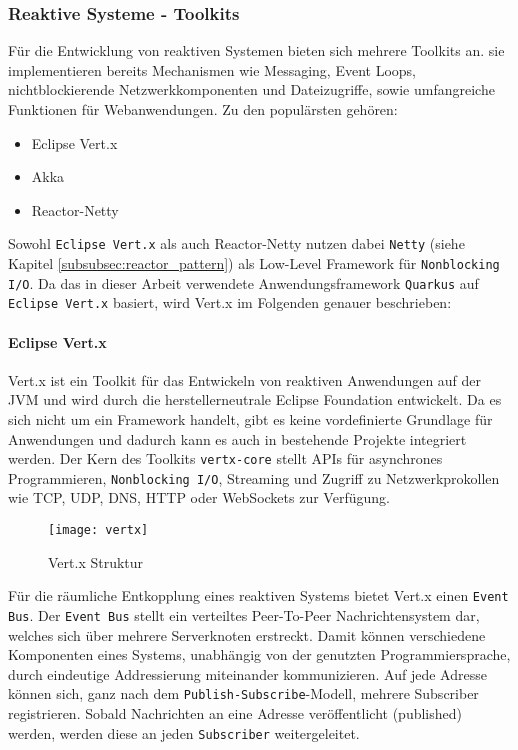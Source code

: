 \subsubsection{Reaktive Systeme - Toolkits}
\label{subsubsec:reaktive_systeme}
Für die Entwicklung von reaktiven Systemen bieten sich mehrere Toolkits an.
sie implementieren bereits Mechanismen wie Messaging, Event Loops,
nichtblockierende Netzwerkkomponenten und Dateizugriffe, sowie umfangreiche Funktionen für Webanwendungen.
Zu den populärsten gehören:
\begin{itemize}
  \item Eclipse Vert.x \parencite{Vert.x}
  \item Akka \parencite{Akka}
  \item Reactor-Netty \parencite{ProjectReactor}
\end{itemize}
Sowohl \verb|Eclipse Vert.x| als auch Reactor-Netty nutzen dabei \verb|Netty|
(siehe Kapitel \ref{subsubsec:reactor_pattern}) als Low-Level Framework für \verb|Nonblocking I/O|.
Da das in dieser Arbeit verwendete Anwendungsframework \verb|Quarkus| auf \verb|Eclipse Vert.x| basiert, wird Vert.x im Folgenden genauer beschrieben:

\paragraph{Eclipse Vert.x}
Vert.x ist ein Toolkit für das Entwickeln von reaktiven Anwendungen auf der JVM und wird durch die herstellerneutrale Eclipse Foundation entwickelt.
Da es sich nicht um ein Framework handelt, gibt es keine vordefinierte Grundlage für Anwendungen und dadurch kann es auch in bestehende Projekte
integriert werden.
Der Kern des Toolkits \verb|vertx-core| stellt APIs für asynchrones Programmieren, \verb|Nonblocking I/O|, Streaming und Zugriff zu
Netzwerkprokollen wie TCP, UDP, DNS, HTTP oder WebSockets zur Verfügung.
\begin{figure}[ht!]
  \centering
  \texttt{[image: vertx]}
  \caption{Vert.x Struktur \parencite{Ponge2020}}
  \label{fig:vertx}
\end{figure}

Für die räumliche Entkopplung eines reaktiven Systems bietet Vert.x einen \verb|Event Bus|.
Der \verb|Event Bus| stellt ein verteiltes Peer-To-Peer Nachrichtensystem dar, welches sich über mehrere Serverknoten erstreckt.
Damit können verschiedene Komponenten eines Systems, unabhängig von der genutzten Programmiersprache, durch eindeutige Addressierung miteinander kommunizieren.
Auf jede Adresse können sich, ganz nach dem \verb|Publish-Subscribe|-Modell, mehrere Subscriber registrieren. Sobald Nachrichten an eine
Adresse veröffentlicht (published) werden, werden diese an jeden \verb|Subscriber| weitergeleitet.

